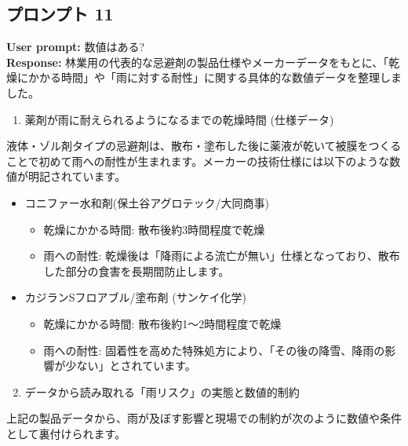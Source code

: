 \documentclass[a4paper, 11pt]{jsarticle}
\begin{document}
\subsection{プロンプト 11}
\noindent\textbf{User prompt:} 数値はある? \\
\noindent\textbf{Response:} 林業用の代表的な忌避剤の製品仕様やメーカーデータをもとに、「乾燥にかかる時間」や「雨に対する耐性」に関する具体的な数値データを整理しました。
\begin{enumerate}
    \item 薬剤が雨に耐えられるようになるまでの乾燥時間 (仕様データ)
\end{enumerate}
液体・ゾル剤タイプの忌避剤は、散布・塗布した後に薬液が乾いて被膜をつくることで初めて雨への耐性が生まれます。メーカーの技術仕様には以下のような数値が明記されています。
\begin{itemize}
    \item コニファー水和剤(保土谷アグロテック/大同商事)\cite{ref12,ref15}
    \begin{itemize}
        \item[○] 乾燥にかかる時間: 散布後約3時間程度で乾燥
        \item[○] 雨への耐性: 乾燥後は「降雨による流亡が無い」仕様となっており、散布した部分の食害を長期間防止します。
    \end{itemize}
    \item カジランSフロアブル/塗布剤 (サンケイ化学)\cite{ref20}
    \begin{itemize}
        \item[○] 乾燥にかかる時間: 散布後約1〜2時間程度で乾燥
        \item[○] 雨への耐性: 固着性を高めた特殊処方により、「その後の降雪、降雨の影響が少ない」とされています。
    \end{itemize}
\end{itemize}
\begin{enumerate}
    \setcounter{enumi}{1}
    \item データから読み取れる「雨リスク」の実態と数値的制約
\end{enumerate}
上記の製品データから、雨が及ぼす影響と現場での制約が次のように数値や条件として裏付けられます。
\end{document}
